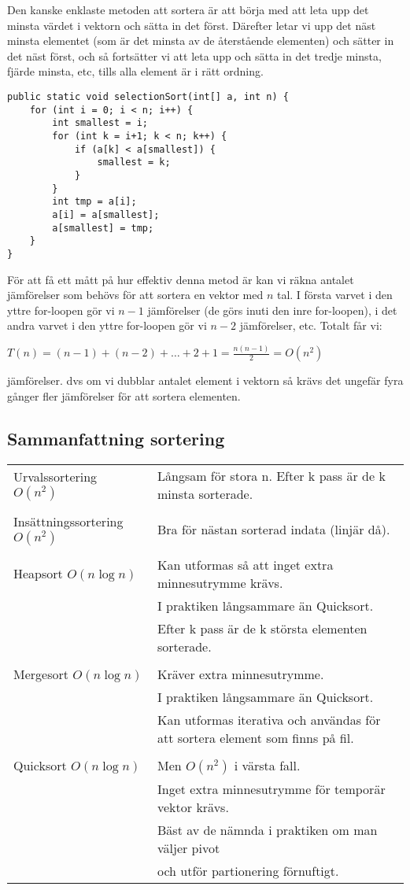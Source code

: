 \documentclass[11pt]{article}
\begin{document}
Den kanske enklaste metoden att sortera är att börja med att leta upp det minsta värdet i vektorn och sätta in det först. Därefter letar vi upp det näst minsta elementet (som är det minsta av de återstående elementen) och sätter in det näst först, och så fortsätter vi att leta upp och sätta in det tredje minsta, fjärde minsta, etc, tills alla element är i rätt ordning. 
\begin{lstlisting}
public static void selectionSort(int[] a, int n) {
	for (int i = 0; i < n; i++) {
		int smallest = i;
		for (int k = i+1; k < n; k++) {
			if (a[k] < a[smallest]) {
				smallest = k;
			}
		}
		int tmp = a[i];
		a[i] = a[smallest];
		a[smallest] = tmp;
	}
}
\end{lstlisting}
För att få ett mått på hur effektiv denna metod är kan vi räkna antalet jämförelser som behövs för att sortera en vektor med $n$ tal. I första varvet i den yttre for-loopen gör vi $ n - 1$ jämförelser (de görs inuti den inre for-loopen), i det andra varvet i den yttre for-loopen gör vi $n - 2$ jämförelser, etc. Totalt får vi: 
\begin{center}
$ T(n) = (n -1) + (n-2) + \dots + 2 + 1 = \frac{n(n-1)}{2} = O(n^2)$
\end{center}
jämförelser. dvs om vi dubblar antalet element i vektorn så krävs det ungefär fyra gånger fler jämförelser för att sortera elementen. 
\subsection{Sammanfattning sortering}
\begin{tabular}{l|l}
Urvalssortering $O(n^2)$		&	Långsam för stora n. Efter k pass är de k minsta sorterade. \\ \\
Insättningssortering $O(n^2)$	&	Bra för nästan sorterad indata (linjär då). \\ \\
Heapsort $O(n \log n)$ 			&	Kan utformas så att inget extra minnesutrymme krävs. \\
								& 	I praktiken långsammare än Quicksort. \\
								&	Efter k pass är de k största elementen sorterade. \\ \\
Mergesort $O(n\log n)$			& 	Kräver extra minnesutrymme. \\
								&	I praktiken långsammare än Quicksort. \\
								& 	Kan utformas iterativa och användas för att sortera element som finns på fil. \\ \\
Quicksort $O(n \log n)$			& 	Men $O(n^2)$ i värsta fall. \\
								&	Inget extra minnesutrymme för temporär vektor krävs. \\ 
								&	Bäst av de nämnda i praktiken om man väljer pivot \\ 
								&	och utför partionering förnuftigt. \\
\end{tabular}
\end{document}

